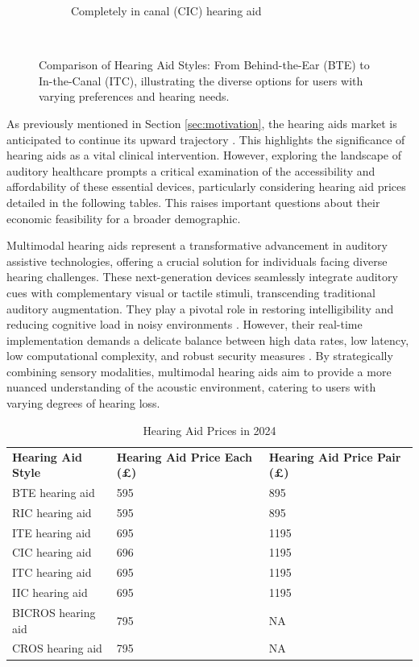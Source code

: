 \documentclass{l4proj}
\begin{document}
\begin{figure}
\begin{subfigure}[b]{0.2\textwidth}
        \caption{Completely in canal (CIC) hearing aid}
        \label{fig:aid4}
    \end{subfigure}
    ~ %
    \caption{Comparison of Hearing Aid Styles: From Behind-the-Ear (BTE) to In-the-Canal (ITC), illustrating the diverse options for users with varying preferences and hearing needs.}\label{fig:hearing-aids}
\end{figure}

As previously mentioned in Section \ref{sec:motivation}, the hearing aids market is anticipated to continue its upward trajectory \citep{Market_Research_Firm}. This highlights the significance of hearing aids as a vital clinical intervention. However, exploring the landscape of auditory healthcare prompts a critical examination of the accessibility and affordability of these essential devices, particularly considering hearing aid prices detailed in the following tables. This raises important questions about their economic feasibility for a broader demographic.

Multimodal hearing aids represent a transformative advancement in auditory assistive technologies, offering a crucial solution for individuals facing diverse hearing challenges. These next-generation devices seamlessly integrate auditory cues with complementary visual or tactile stimuli, transcending traditional auditory augmentation. They play a pivotal role in restoring intelligibility and reducing cognitive load in noisy environments \citep{shah2022novel}. However, their real-time implementation demands a delicate balance between high data rates, low latency, low computational complexity, and robust security measures \citep{novel}. By strategically combining sensory modalities, multimodal hearing aids aim to provide a more nuanced understanding of the acoustic environment, catering to users with varying degrees of hearing loss. 

\begin{table}[htbp]
    \caption{Hearing Aid Prices in 2024}\label{tab:hearing_aid_prices}
    \begin{tabular}{@{}lll@{}}
    \textbf{Hearing Aid Style} & \textbf{Hearing Aid Price Each (£)} & \textbf{Hearing Aid Price Pair (£)} \\ 
    BTE hearing aid  & 595 & 895 \\ 
    RIC hearing aid  & 595 & 895 \\ 
    ITE hearing aid  & 695 & 1195 \\ 
    CIC hearing aid  & 696 & 1195 \\ 
    ITC hearing aid  & 695 & 1195 \\ 
    IIC hearing aid  & 695 & 1195 \\ 
    BICROS hearing aid  & 795 & NA \\ 
    CROS hearing aid  & 795 & NA \\
\end{tabular}
\end{table}
\end{document}

